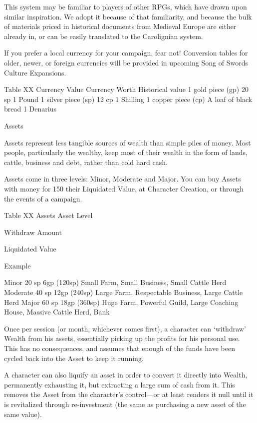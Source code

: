\documentclass[oneside,11pt,english]{book}
\begin{document}
This system may be familiar to players of other RPGs, which have drawn upon similar inspiration. We adopt it because of that familiarity, and because the bulk of materials priced in historical documents from Medieval Europe are either already in, or can be easily translated to the Carolignian system.


If you prefer a local currency for your campaign, fear not! Conversion tables for older, newer, or foreign currencies will be provided in upcoming Song of Swords Culture Expansions.


Table XX Currency Value 
Currency Worth Historical value 
1 gold piece (gp) 20 sp 1 Pound 
1 silver piece (sp) 12 cp 1 Shilling 
1 copper piece (cp) A loaf of black bread 1 Denarius 

 

Assets 

 
Assets represent less tangible sources of wealth than simple piles of money. Most people, particularly the 
wealthy, keep most of their wealth in the form of lands, cattle, business and debt, rather than cold hard 
cash. 

 


Assets come in three levels: Minor, Moderate and Major. You can buy Assets with money for 150%
their Liquidated Value, at Character Creation, or through the events of a campaign. 

 
Table XX Assets 
Asset 
Level 

Withdraw 
Amount 

Liquidated 
Value 

Example 

Minor 20 sp 6gp (120sp) Small Farm, Small Business, Small Cattle Herd 
Moderate 40 sp 12gp (240sp) Large Farm, Respectable Business, Large Cattle Herd 
Major 60 sp 18gp (360sp) Huge Farm, Powerful Guild, Large Coaching House, Massive 
Cattle Herd, Bank 

 

Once per session (or month, whichever comes first), a character can ‘withdraw’ Wealth from his assets, 
essentially picking up the profits for his personal use. This has no consequences, and assumes that enough 
of the funds have been cycled back into the Asset to keep it running. 

 

A character can also liquify an asset in order to convert it directly into Wealth, permanently exhausting it, 
but extracting a large sum of cash from it. This removes the Asset from the character’s control—or at 
least renders it null until it is revitalized through re-investment (the same as purchasing a new asset of the 
same value). 
\end{document}
